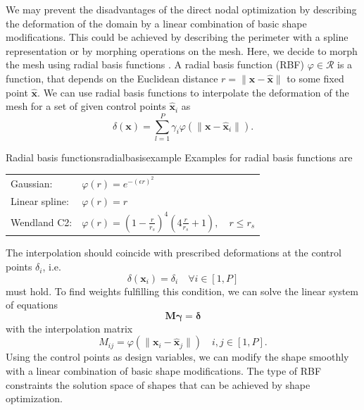 We may prevent the disadvantages of the direct nodal optimization by describing the deformation of the domain by a linear combination of basic shape modifications. This could be achieved by describing the perimeter with a spline representation \cite{Christensen2008} or by morphing operations on the mesh. Here, we decide to morph the mesh using radial basis functions \cite{Biancolini20}. 
A radial basis function (RBF) $\varphi \in \mathcal{R}$ is a function, that depends on the Euclidean distance $r = \lVert \mathbf{x}-\hat{\mathbf{x}} \rVert$ to some fixed point $\hat{\mathbf{x}}$.
We can use radial basis functions to interpolate the deformation of the mesh for a set of given control points $\hat{\mathbf{x}}_i$ as 
\begin{equation}
    \delta(\mathbf{x}) = \sum_{l=1}^P \gamma_i \varphi(\lVert \mathbf{x}-\hat{\mathbf{x}}_i \rVert).
\end{equation}

\begin{example}{Radial basis functions}{radialbasisexample}   
    Examples for radial basis functions are
    \begin{center}
        \begin{tabular}{ll}
            Gaussian: & $\varphi(r) = e^{-(\epsilon r)^2}$ \\
            Linear spline: & $\varphi(r) = r$ \\
            Wendland C2: & $\varphi(r) = (1-\frac{r}{r_s})^4(4\frac{r}{r_s}+1),\quad  r \le r_s$ 
        \end{tabular}
    \end{center}
\end{example}

The interpolation should coincide with prescribed deformations at the control points $\delta_i$, i.e. 
\begin{equation}
    \delta(\mathbf{x}_i) = \delta_i \quad \forall i \in [1, P]
\end{equation}
must hold. To find weights fulfilling this condition, we can solve the linear system of equations 
\begin{equation}
    \mathbf{M} \pmb{\gamma} = \pmb{\delta} 
\end{equation}
with the interpolation matrix 
\begin{equation}
    M_{ij} = \varphi(\lVert \mathbf{x}_i-\hat{\mathbf{x}}_j \rVert) \quad i,j \in [1, P]. 
\end{equation}
Using the control points as design variables, we can modify the shape smoothly with a linear combination of basic shape modifications. The type of RBF constraints the solution space of shapes that can be achieved by shape optimization. 

